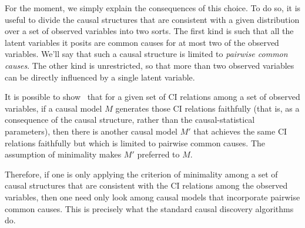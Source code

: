\documentclass[12pt,onecolumn,nofootinbib]{revtex4-2}
\begin{document}
For the moment, we simply explain the consequences of this choice.  To do so, it is useful to divide the causal structures that are consistent with a given distribution over a set of observed variables into two sorts.  The first kind is such that all the latent variables it posits are common causes for at most two of the observed variables. We'll say that such a causal structure is limited to \emph{pairwise common causes}.  The other kind is unrestricted, so that more than two observed variables can be directly influenced by a single latent variable.

It is possible to show~\cite{Verma1993}  that for a given set of CI relations among a set of observed variables, if a causal model $M$ generates those CI relations faithfully (that is, as a consequence of the causal structure, rather than the causal-statistical parameters), then there is another causal model $M'$ that achieves the same CI relations faithfully but which is limited to pairwise common causes.  The assumption of minimality makes $M'$  preferred to $M$.

Therefore, if one is only applying the criterion of minimality among a set of causal structures that are consistent with the CI relations among the observed variables, then one need only look among causal models that incorporate pairwise common causes.  
This is precisely what the standard causal discovery algorithms do. 
\end{document}
